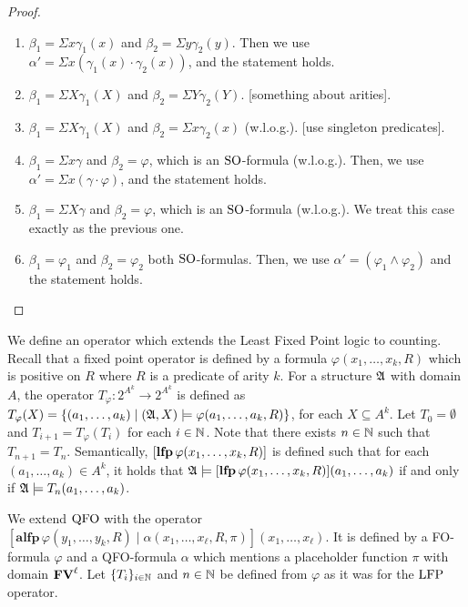 \begin{proof}
\begin{enumerate}
		\begin{enumerate}
			\item $\beta_1 = \Sigma x \gamma_1(x)$ and $\beta_2 = \Sigma y \gamma_2(y)$. Then we use $\alpha' = \Sigma x(\gamma_1(x)\cdot\gamma_2(x))$, and the statement holds.
			\item $\beta_1 = \Sigma X \gamma_1(X)$ and $\beta_2 = \Sigma Y \gamma_2(Y)$. [something about arities].
			\item $\beta_1 = \Sigma X \gamma_1(X)$ and $\beta_2 = \Sigma x \gamma_2(x)$ (w.l.o.g.). [use singleton predicates].
			\item $\beta_1 = \Sigma x \gamma$ and $\beta_2 = \varphi$, which is an ${\rm SO}$-formula (w.l.o.g.). Then, we use $\alpha' = \Sigma x (\gamma \cdot \varphi)$, and the statement holds.
			\item $\beta_1 = \Sigma X \gamma$ and $\beta_2 = \varphi$, which is an ${\rm SO}$-formula (w.l.o.g.). We treat this case exactly as the previous one.
			\item $\beta_1 = \varphi_1$ and $\beta_2 = \varphi_2$ both ${\rm SO}$-formulas. Then, we use $\alpha' = (\varphi_1 \wedge \varphi_2)$ and the statement holds.
		\end{enumerate}
	\end{enumerate}
\end{proof}

We define an operator which extends the Least Fixed Point logic to counting. Recall that a fixed point operator is defined by a formula $\varphi(x_1,\ldots,x_k,R)$ which is positive on $R$ where $R$ is a predicate of arity $k$. For a structure $\mathfrak{A}$ with domain $A$, the operator $T_{\varphi}:2^{A^k} \to 2^{A^k}$ is defined as $T_{\varphi}(X) = \{(a_1,\ldots,a_k)\mid (\mathfrak{A},X)\models \varphi(a_1,\ldots,a_k,R) \}$, for each $X\subseteq A^k$. Let $T_0 = \emptyset$ and $T_{i+1} = T_{\varphi}(T_i)$ for each $i \in \mathbb{N}$. Note that there exists $n\in \mathbb{N}$ such that $T_{n+1} = T_n$. Semantically, $[{\bf lfp}\,\varphi(x_1,\ldots,x_k,R)]$ is defined such that for each $(a_1,\ldots,a_k)\in A^k$, it holds that $\mathfrak{A}\models[{\bf lfp}\,\varphi(x_1,\ldots,x_k,R)](a_1,\ldots,a_k)$ if and only if $\mathfrak{A}\models T_n(a_1,\ldots,a_k)$.

We extend ${\rm QFO}$ with the operator $[\textbf{alfp}\,\varphi(y_1,\ldots,y_k,R)\mid\alpha(x_1,\ldots,x_{\ell},R,\pi)](x_1,\ldots,x_{\ell})$. It is defined by a FO-formula $\varphi$ and a QFO-formula $\alpha$ which mentions a placeholder function $\pi$ with domain $\mathbf{FV}^{\ell}$. Let $\{T_i\}_{i\in\mathbb{N}}$ and $n\in\mathbb{N}$ be defined from $\varphi$ as it was for the ${\rm LFP}$ operator.

